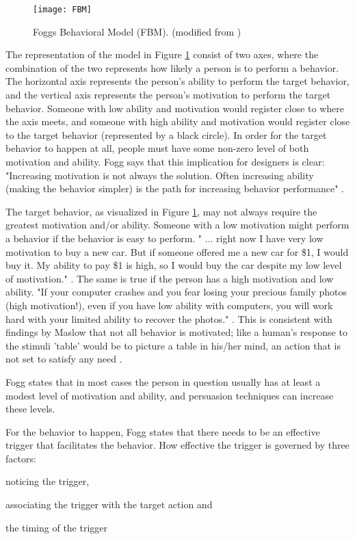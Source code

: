 \begin{figure}[h]
  \centering
    \texttt{[image: FBM]}
  \caption{Foggs Behavioral Model (FBM). (modified from \cite{Fogg2009})}
  \label{fig:FBM}
\end{figure}

The representation of the model in Figure \ref{fig:FBM} consist of two axes, where the combination of the two represents how likely a person is to perform a behavior. The horizontal axis represents the person's ability to perform the target behavior, and the vertical axis represents the person's motivation to perform the target behavior. Someone with low ability and motivation would register close to where the axis meets, and someone with high ability and motivation would register close to the target behavior (represented by a black circle). In order for the target behavior to happen at all, people must have some non-zero level of both motivation and ability. Fogg says that this implication for designers is clear: "Increasing motivation is not always the solution. Often increasing ability (making the behavior simpler) is the path for increasing behavior performance" \cite{Fogg2009}.

The target behavior, as visualized in Figure \ref{fig:FBM}, may not always require the greatest motivation and/or ability. Someone with a low motivation might perform a behavior if the behavior is easy to perform. " ... right now I have very low motivation to buy a new car. But if someone offered me a new car for \$1, I would buy it. My ability to pay \$1 is high, so I would buy the car despite my low level of motivation." \cite{Fogg2009}. The same is true if the person has a high motivation and low ability. "If your computer crashes and you fear losing your precious family photos (high motivation!), even if you have low ability with computers, you will work hard with your limited ability to recover the photos." \cite{Fogg2009}. This is consistent with findings by Maslow that not all behavior is motivated; like a human's response to the stimuli 'table' would be to picture a table in his/her mind, an action that is not set to satisfy any need \cite{Maslow1943}.

Fogg states that in most cases the person in question usually has at least a modest level of motivation and ability, and persuasion techniques can increase these levels.

For the behavior to happen, Fogg states that there needs to be an effective trigger that facilitates the behavior. How effective the trigger is governed by three factors: \begin{enumerate*}[label=(\(\arabic*\))]
  \item noticing the trigger,
  \item associating the trigger with the target action and
  \item the timing of the trigger
\end{enumerate*}

